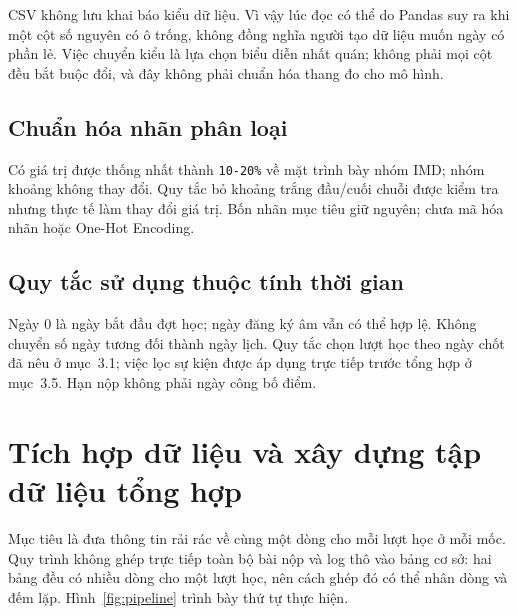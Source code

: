 CSV không lưu khai báo kiểu dữ liệu. Vì vậy  lúc đọc có thể do Pandas suy ra khi một cột số nguyên có ô trống, không đồng nghĩa người tạo dữ liệu muốn ngày có phần lẻ. Việc chuyển kiểu là lựa chọn biểu diễn nhất quán; không phải mọi cột đều bắt buộc đổi, và đây không phải chuẩn hóa thang đo cho mô hình.

\subsection{Chuẩn hóa nhãn phân loại}
Có \NImdLabels{} giá trị  được thống nhất thành \texttt{10-20\%} về mặt trình bày nhóm IMD; nhóm khoảng không thay đổi. Quy tắc bỏ khoảng trắng đầu/cuối chuỗi được kiểm tra nhưng thực tế làm thay đổi \NWhitespaceChanges{} giá trị. Bốn nhãn mục tiêu giữ nguyên; chưa mã hóa nhãn hoặc One-Hot Encoding.

\subsection{Quy tắc sử dụng thuộc tính thời gian}
Ngày 0 là ngày bắt đầu đợt học; ngày đăng ký âm vẫn có thể hợp lệ. Không chuyển số ngày tương đối thành ngày lịch. Quy tắc chọn lượt học theo ngày chốt đã nêu ở mục~3.1; việc lọc sự kiện được áp dụng trực tiếp trước tổng hợp ở mục~3.5. Hạn nộp không phải ngày công bố điểm.
\FloatBarrier

\section{Tích hợp dữ liệu và xây dựng tập dữ liệu tổng hợp}
\label{sec:integration}
Mục tiêu là đưa thông tin rải rác về cùng một dòng cho mỗi lượt học ở mỗi mốc. Quy trình không ghép trực tiếp toàn bộ bài nộp và log thô vào bảng cơ sở: hai bảng đều có nhiều dòng cho một lượt học, nên cách ghép đó có thể nhân dòng và đếm lặp. Hình~\ref{fig:pipeline} trình bày thứ tự thực hiện.

